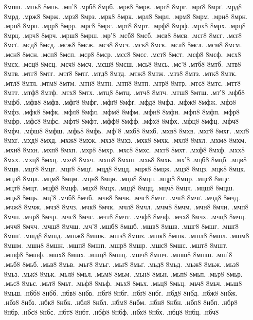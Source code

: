{8мпш.
.мпь8
8мпь.
.мп'8
.мрб8
8мрб.
.мрв8
8мрв.
.мрг8
8мрг.
.мрґ8
8мрґ.
.мрд8
8мрд.
.мрж8
8мрж.
.мрз8
8мрз.
.мрк8
8мрк.
.мрл8
8мрл.
.мрм8
8мрм.
.мрн8
8мрн.
.мрп8
8мрп.
.мрр8
8мрр.
.мрс8
8мрс.
.мрт8
8мрт.
.мрф8
8мрф.
.мрх8
8мрх.
.мрц8
8мрц.
.мрч8
8мрч.
.мрш8
8мрш.
.мр'8
.мсб8
8мсб.
.мсв8
8мсв.
.мсг8
8мсг.
.мсґ8
8мсґ.
.мсд8
8мсд.
.мсж8
8мсж.
.мсз8
8мсз.
.мск8
8мск.
.мсл8
8мсл.
.мсм8
8мсм.
.мсн8
8мсн.
.мсп8
8мсп.
.мср8
8мср.
.мсс8
8мсс.
.мст8
8мст.
.мсф8
8мсф.
.мсх8
8мсх.
.мсц8
8мсц.
.мсч8
8мсч.
.мсш8
8мсш.
.мсь8
8мсь.
.мс'8
.мтб8
8мтб.
.мтв8
8мтв.
.мтг8
8мтг.
.мтґ8
8мтґ.
.мтд8
8мтд.
.мтж8
8мтж.
.мтз8
8мтз.
.мтк8
8мтк.
.мтл8
8мтл.
.мтм8
8мтм.
.мтн8
8мтн.
.мтп8
8мтп.
.мтр8
8мтр.
.мтс8
8мтс.
.мтт8
8мтт.
.мтф8
8мтф.
.мтх8
8мтх.
.мтц8
8мтц.
.мтч8
8мтч.
.мтш8
8мтш.
.мт'8
.мфб8
8мфб.
.мфв8
8мфв.
.мфг8
8мфг.
.мфґ8
8мфґ.
.мфд8
8мфд.
.мфж8
8мфж.
.мфз8
8мфз.
.мфк8
8мфк.
.мфл8
8мфл.
.мфм8
8мфм.
.мфн8
8мфн.
.мфп8
8мфп.
.мфр8
8мфр.
.мфс8
8мфс.
.мфт8
8мфт.
.мфф8
8мфф.
.мфх8
8мфх.
.мфц8
8мфц.
.мфч8
8мфч.
.мфш8
8мфш.
.мфь8
8мфь.
.мф'8
.мхб8
8мхб.
.мхв8
8мхв.
.мхг8
8мхг.
.мхґ8
8мхґ.
.мхд8
8мхд.
.мхж8
8мхж.
.мхз8
8мхз.
.мхк8
8мхк.
.мхл8
8мхл.
.мхм8
8мхм.
.мхн8
8мхн.
.мхп8
8мхп.
.мхр8
8мхр.
.мхс8
8мхс.
.мхт8
8мхт.
.мхф8
8мхф.
.мхх8
8мхх.
.мхц8
8мхц.
.мхч8
8мхч.
.мхш8
8мхш.
.мхь8
8мхь.
.мх'8
.мцб8
8мцб.
.мцв8
8мцв.
.мцг8
8мцг.
.мцґ8
8мцґ.
.мцд8
8мцд.
.мцж8
8мцж.
.мцз8
8мцз.
.мцк8
8мцк.
.мцл8
8мцл.
.мцм8
8мцм.
.мцн8
8мцн.
.мцп8
8мцп.
.мцр8
8мцр.
.мцс8
8мцс.
.мцт8
8мцт.
.мцф8
8мцф.
.мцх8
8мцх.
.мцц8
8мцц.
.мцч8
8мцч.
.мцш8
8мцш.
.мць8
8мць.
.мц'8
.мчб8
8мчб.
.мчв8
8мчв.
.мчг8
8мчг.
.мчґ8
8мчґ.
.мчд8
8мчд.
.мчж8
8мчж.
.мчз8
8мчз.
.мчк8
8мчк.
.мчл8
8мчл.
.мчм8
8мчм.
.мчн8
8мчн.
.мчп8
8мчп.
.мчр8
8мчр.
.мчс8
8мчс.
.мчт8
8мчт.
.мчф8
8мчф.
.мчх8
8мчх.
.мчц8
8мчц.
.мчч8
8мчч.
.мчш8
8мчш.
.мч'8
.мшб8
8мшб.
.мшв8
8мшв.
.мшг8
8мшг.
.мшґ8
8мшґ.
.мшд8
8мшд.
.мшж8
8мшж.
.мшз8
8мшз.
.мшк8
8мшк.
.мшл8
8мшл.
.мшм8
8мшм.
.мшн8
8мшн.
.мшп8
8мшп.
.мшр8
8мшр.
.мшс8
8мшс.
.мшт8
8мшт.
.мшф8
8мшф.
.мшх8
8мшх.
.мшц8
8мшц.
.мшч8
8мшч.
.мшш8
8мшш.
.мш'8
.мьб8
8мьб.
.мьв8
8мьв.
.мьг8
8мьг.
.мьґ8
8мьґ.
.мьд8
8мьд.
.мьж8
8мьж.
.мьз8
8мьз.
.мьк8
8мьк.
.мьл8
8мьл.
.мьм8
8мьм.
.мьн8
8мьн.
.мьп8
8мьп.
.мьр8
8мьр.
.мьс8
8мьс.
.мьт8
8мьт.
.мьф8
8мьф.
.мьх8
8мьх.
.мьц8
8мьц.
.мьч8
8мьч.
.мьш8
8мьш.
.нбб8
8нбб.
.нбв8
8нбв.
.нбг8
8нбг.
.нбґ8
8нбґ.
.нбд8
8нбд.
.нбж8
8нбж.
.нбз8
8нбз.
.нбк8
8нбк.
.нбл8
8нбл.
.нбм8
8нбм.
.нбн8
8нбн.
.нбп8
8нбп.
.нбр8
8нбр.
.нбс8
8нбс.
.нбт8
8нбт.
.нбф8
8нбф.
.нбх8
8нбх.
.нбц8
8нбц.
.нбч8
}
